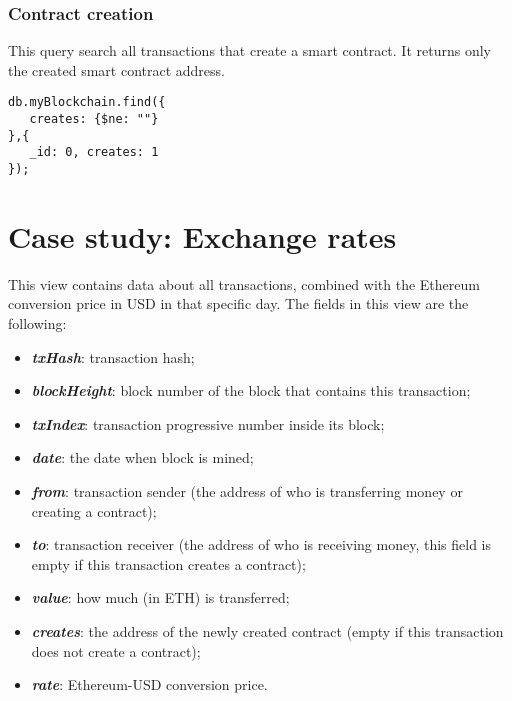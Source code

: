 \subsubsection{Contract creation}
This query search all transactions that create a smart contract. It returns only the created smart contract address. 
\begin{center}
\begin{varwidth}{\linewidth}
\begin{verbatim}
db.myBlockchain.find({
   creates: {$ne: ""}
},{
   _id: 0, creates: 1
});

\end{verbatim}
\end{varwidth}
\end{center}
\section{Case study: Exchange rates}
This view contains data about all transactions, combined with the Ethereum conversion price in USD in that specific day. 
The fields in this view are the following:
\begin{itemize}
    \item \textit{\textbf{txHash}}: transaction hash;
    \item \textit{\textbf{blockHeight}}: block number of the block that contains this transaction;
    \item \textit{\textbf{txIndex}}: transaction progressive number inside its block;
    \item \textit{\textbf{date}}: the date when block is mined;
    \item \textit{\textbf{from}}: transaction sender (the address of who is transferring money or creating a contract);
    \item \textit{\textbf{to}}: transaction receiver (the address of who is receiving money, this field is empty if this transaction creates a contract);
    \item \textit{\textbf{value}}: how much (in ETH) is transferred;
    \item \textit{\textbf{creates}}: the address of the newly created contract (empty if this transaction does not create a contract);
    \item \textit{\textbf{rate}}: Ethereum-USD conversion price.
\end{itemize}
